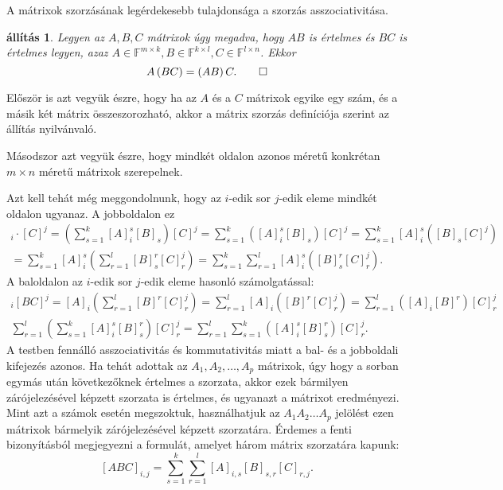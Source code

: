 \documentclass[9pt, a4paper, showtrims]{memoir}
\makeatletter
\renewenvironment{proof}[1][\proofname]
    {\par\pushQED{\qed}%
    \normalfont \topsep6\p@\@plus6\p@\relax
    \trivlist
    \item[\hskip\labelsep
        \itshape
    #1\@addpunct{:}]\ignorespaces}
    {\popQED\endtrivlist\@endpefalse}
\theoremstyle{plain}
\newtheorem{proposition}{állítás}[chapter]
\theoremstyle{remark}
\theoremstyle{definition}
\makeatother
\begin{document}
A mátrixok szorzásának legérdekesebb tulajdonsága a szorzás asszociativitása.
\begin{proposition}
	Legyen az $A,B,C$ mátrixok úgy megadva, hogy $AB$ is értelmes és $BC$ is értelmes legyen,
	azaz $A\in\mathbb{F}^{m\times k},B\in\mathbb{F}^{k\times l}, C\in\mathbb{F}^{l\times n}$.
	Ekkor
	\[
		A\left( BC \right)=\left( AB \right)C.\qedhere
	\]
\end{proposition}
\begin{proof}
	Először is azt vegyük észre,
	hogy ha az $A$ és a $C$ mátrixok egyike egy szám,
	és a másik két mátrix összeszorozható,
	akkor a mátrix szorzás definíciója szerint az állítás nyilvánvaló.

	Másodszor azt vegyük észre, hogy mindkét oldalon azonos méretű
	konkrétan $m\times n$ méretű mátrixok szerepelnek.

	Azt kell tehát még meggondolnunk,
	hogy az $i$-edik sor $j$-edik eleme mindkét oldalon ugyanaz.
	A jobboldalon ez
	\begin{multline*}
		[AB]_i\cdot [C]^j
		=
		\left( \sum_{s=1}^k[A]_i^s[B]_s \right)[C]^j
		=
		\sum_{s=1}^k\left([A]_i^s[B]_s\right)[C]^j
		=
		\sum_{s=1}^k[A]_i^s\left([B]_s[C]^j\right)
		\\
		=
		\sum_{s=1}^k[A]_i^s\left(\sum_{r=1}^l[B]_s^r[C]_r^j\right)
		=
		\sum_{s=1}^k\sum_{r=1}^l[A]_i^s([B]_s^r[C]_r^j).
	\end{multline*}
	A baloldalon
	az $i$-edik sor $j$-edik eleme hasonló számolgatással:
	\begin{multline*}
		[A]_i[BC]^j=
		[A]_i\left( \sum_{r=1}^l[B]^r[C]_r^j \right)
		=
		\sum_{r=1}^l[A]_i\left([B]^r[C]_r^j\right)
		=
		\sum_{r=1}^l\left([A]_i[B]^r\right)[C]_r^j
		\\
		\sum_{r=1}^l\left(\sum_{s=1}^k[A]_i^s[B]_s^r\right)[C]_r^j
		=
		\sum_{r=1}^l\sum_{s=1}^k\left([A]_i^s[B]_s^r\right)[C]_r^j.
	\end{multline*}
	A testben fennálló asszociativitás és kommutativitás miatt a bal- és a jobboldali kifejezés azonos.
\end{proof}
Ha tehát adottak az $A_1,A_2,\ldots,A_p$ mátrixok, úgy hogy a sorban egymás után következőknek értelmes a szorzata,
akkor ezek bármilyen zárójelezésével képzett szorzata is értelmes,
és ugyanazt a mátrixot eredményezi.
Mint azt a számok esetén megszoktuk,
használhatjuk az $A_1A_2\dots A_p$ jelölést ezen mátrixok bármelyik zárójelezésével képzett szorzatára.
Érdemes a fenti bizonyításból megjegyezni a formulát,
amelyet három mátrix szorzatára kapunk:
\[
	\left[ ABC \right]_{i,j}
	=
	\sum_{s=1}^k\sum_{r=1}^l\left[ A \right]_{i,s}\left[ B \right]_{s,r}\left[ C \right]_{r,j}.
\]
\end{document}

